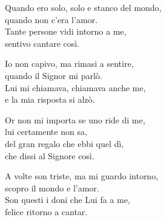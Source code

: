 

\spazio

\strofa Quando ero solo, solo e stanco del mondo,\\
quando non c'era l'amor.\\
Tante persone vidi intorno a me,\\
sentivo cantare così.

\spazio


\spazio

\strofa Io non capivo, ma rimasi a sentire,\\
quando il Signor mi parlò.\\
Lui mi chiamava, chiamava anche me,\\
e la mia risposta si alzò.

\spazio


\spazio

\strofa Or non mi importa se uno ride di me,\\
lui certamente non sa,\\
del gran regalo che ebbi quel dì,\\
che dissi al Signore così.

\spazio


\spazio

\strofa A volte son triste, ma mi guardo intorno,\\
scopro il mondo e l'amor.\\
Son questi i doni che Lui fa a me,\\
felice ritorno a cantar.

\spazio

